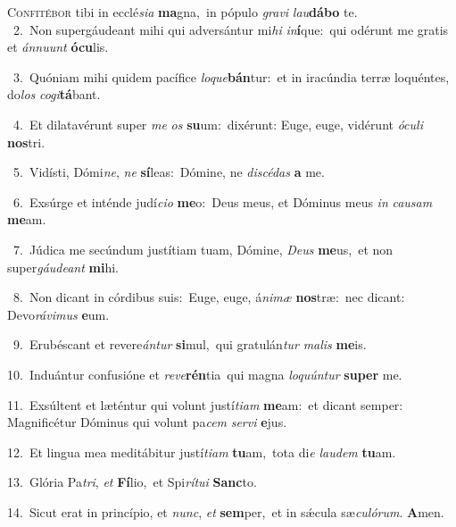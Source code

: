 \lettrine{\initial\textcolor{\initialcolor}{C}}{onfitébor} tibi in ecclé\-\textit{si}\-\textit{a} \textbf{ma}\-gna,~\star in pópulo \textit{gra}\-\textit{vi} \textit{lau}\-\textbf{dá}\textbf{bo} te.\\
{\numbfont\textcolor{\numbcolor}{~2.}}~Non supergáudeant mihi qui adversántur mi\textit{hi} \textit{in}\-\textbf{í}que:~\star qui odérunt me gratis et \textit{án}\-\textit{nu}\textit{unt} \textbf{ó}\-\textbf{cu}lis.\par
{\numbfont\textcolor{\numbcolor}{~3.}}~Quóniam mihi quidem pacífice \textit{lo}\-\textit{que}\textbf{bán}tur:~\star et in iracúndia terræ loquéntes, do\textit{los} \textit{co}\-\textit{gi}\textbf{tá}bant.\par
{\numbfont\textcolor{\numbcolor}{~4.}}~Et dilatavérunt super \textit{me} \textit{os} \textbf{su}\-um:~\star dixérunt: Euge, euge, vidérunt \textit{ó}\-\textit{cu}\textit{li} \textbf{nos}\-tri.\par
{\numbfont\textcolor{\numbcolor}{~5.}}~Vidísti, Dómi\-\textit{ne}\-, \textit{ne} \textbf{sí}\-leas:~\star Dómine, ne \textit{di}\-\textit{scé}\textit{das} \textbf{a} me.\par
{\numbfont\textcolor{\numbcolor}{~6.}}~Exsúrge et inténde judí\-\textit{ci}\-\textit{o} \textbf{me}\-o:~\star Deus meus, et Dóminus meus \textit{in} \textit{cau}\-\textit{sam} \textbf{me}\-am.\par
{\numbfont\textcolor{\numbcolor}{~7.}}~Júdica me secúndum justítiam tuam, Dómine, \textit{De}\-\textit{us} \textbf{me}\-us,~\star et non super\-\textit{gáu}\-\textit{de}\textit{ant} \textbf{mi}\-hi.\par
{\numbfont\textcolor{\numbcolor}{~8.}}~Non dicant in córdibus suis:~\dagger Euge, euge, á\-\textit{ni}\-\textit{mæ} \textbf{nos}\-træ:~\star nec dicant: Devo\-\textit{rá}\-\textit{vi}\textit{mus} \textbf{e}\-um.\par
{\numbfont\textcolor{\numbcolor}{~9.}}~Erubéscant et revere\-\textit{án}\-\textit{tur} \textbf{si}\-mul,~\star qui gratulán\textit{tur} \textit{ma}\-\textit{lis} \textbf{me}\-is.\par
{\numbfont\textcolor{\numbcolor}{10.}}~Induántur confusióne et \textit{re}\-\textit{ve}\textbf{rén}tia~\star qui magna \textit{lo}\-\textit{quún}\textit{tur} \textbf{su}\-\textbf{per} me.\par
{\numbfont\textcolor{\numbcolor}{11.}}~Exsúltent et læténtur qui volunt justí\-\textit{ti}\-\textit{am} \textbf{me}\-am:~\star et dicant semper: Magnificétur Dóminus qui volunt pa\textit{cem} \textit{ser}\-\textit{vi} \textbf{e}\-jus.\par
{\numbfont\textcolor{\numbcolor}{12.}}~Et lingua mea meditábitur justí\-\textit{ti}\-\textit{am} \textbf{tu}\-am,~\star tota di\textit{e} \textit{lau}\-\textit{dem} \textbf{tu}\-am.\par
{\numbfont\textcolor{\numbcolor}{13.}}~Glória Pa\-\textit{tri}\-, \textit{et} \textbf{Fí}\-lio,~\star et Spi\-\textit{rí}\-\textit{tu}\textit{i} \textbf{Sanc}\-to.\par
{\numbfont\textcolor{\numbcolor}{14.}}~Sicut erat in princípio, et \textit{nunc}\-, \textit{et} \textbf{sem}\-per,~\star et in sǽcula sæ\-\textit{cu}\-\textit{ló}\textit{rum}. \textbf{A}\-men.\par
